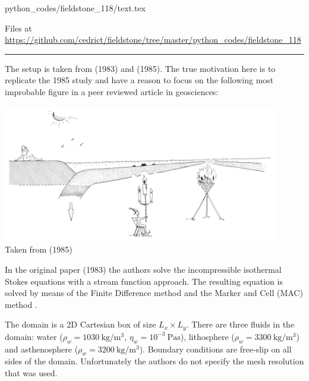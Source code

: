 \begin{flushright} {\tiny {\color{gray} python\_codes/fieldstone\_118/text.tex}} \end{flushright}



\begin{center}
Files at \url{https://github.com/cedrict/fieldstone/tree/master/python_codes/fieldstone_118}
\end{center}

\par\noindent\rule{\textwidth}{0.4pt}


The setup is taken from \textcite{mato83} (1983) and \textcite{futo85} (1985).
The true motivation here is to replicate the 1985 study 
and have a reason to focus on the following most improbable figure in a peer reviewed
article in geosciences:

\begin{center}
\includegraphics[width=12cm]{./images/interesting/futo85}\\
{\captionfont Taken from \textcite{futo85} (1985)}
\end{center}

In the original paper (1983) the authors solve the incompressible isothermal Stokes equations
with a stream function approach. The resulting equation is solved by means of the
Finite Difference method and the Marker and Cell (MAC) method \cite{hawe65}.

The domain is a 2D Cartesian box of size $L_x \times L_y$. There are three fluids in the domain: 
water ($\rho_w=1030~\si{\kg\per\cubic\meter}$, $\eta_w=10^{-3}~\si{\pascal\second}$), 
lithosphere ($\rho_w=3300~\si{\kg\per\cubic\meter}$) and 
asthenosphere ($\rho_w=3200~\si{\kg\per\cubic\meter}$).
Boundary conditions are free-slip on all sides of the domain.
Unfortunately the authors do not specify the mesh resolution that was used. 

